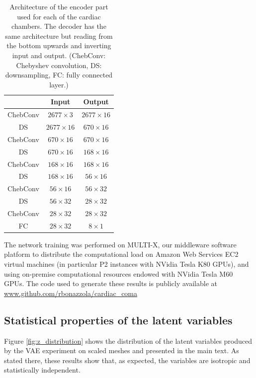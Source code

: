 \begin{table}
\begin{center}
\begin{tabular}{|c|c|c|}
\hline
          & \textbf{Input} & \textbf{Output} \\ \hline
ChebConv  & $2677\times 3$ &  $2677\times 16$ \\ \hline
DS        & $2677\times 16$ & $670\times 16$ \\ \hline
ChebConv  & $670\times 16$ & $670\times 16$ \\ \hline
DS        & $670\times 16$ & $168\times 16$ \\ \hline
ChebConv  & $168\times 16$ & $168\times 16$ \\ \hline
DS        & $168\times 16$ & $56\times 16$\\ \hline
ChebConv  & $56\times 16$ &  $56\times 32$\\ \hline
DS        & $56\times 32$ &  $28\times 32$\\ \hline
ChebConv  & $28\times 32$ &  $28\times 32$\\ \hline
FC        & $28\times 32$ &  $8\times 1$\\ \hline
\end{tabular}
\end{center}
\caption{Architecture of the encoder part used for each of the cardiac chambers. The decoder has the same architecture but reading from the bottom upwards and inverting input and output. (ChebConv: Chebyshev convolution, DS: downsampling, FC: fully connected layer.)}
\label{table:AE_arch}
\end{table}

The network training was performed on MULTI-X, our middleware software platform to distribute the computational load on Amazon Web Services EC2 virtual machines (in particular P2 instances with NVidia Tesla K80 GPUs), and using on-premise computational resources endowed with NVidia Tesla M60 GPUs. The code used to generate these results is publicly available at \url{www.github.com/rbonazzola/cardiac\_coma} %

\subsection{Statistical properties of the latent variables}

Figure \ref{fig:z_distribution} shows the distribution of the latent variables produced by the VAE experiment on scaled meshes and presented in the main text. As stated there, these results show that, as expected, the variables are isotropic and statistically independent.

